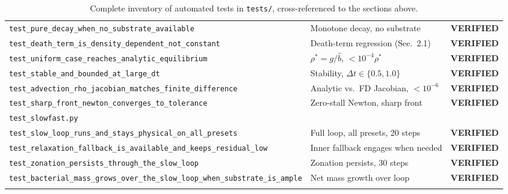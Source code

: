 \documentclass[11pt]{article}
\newcommand{\verified}{\textcolor{green!45!black}{\textbf{VERIFIED}}}
\newcommand{\code}[1]{\texttt{#1}}
\newcommand{\test}[1]{\texttt{\small #1}}
\begin{document}
\begin{longtable}{p{3.6cm}p{9.4cm}c}
\test{test\_pure\_decay\_when\_no\_substrate\_available} & Monotone decay, no substrate & \verified \\
\test{test\_death\_term\_is\_density\_dependent\_not\_constant} & Death-term regression (Sec.~2.1) & \verified \\
\test{test\_uniform\_case\_reaches\_analytic\_equilibrium} & $\rho^\ast=g/\hat b$, $<10^{-4}\rho^\ast$ & \verified \\
\test{test\_stable\_and\_bounded\_at\_large\_dt} & Stability, $\Delta t\in\{0.5,1.0\}$ & \verified \\
\test{test\_advection\_rho\_jacobian\_matches\_finite\_difference} & Analytic vs.\ FD Jacobian, $<10^{-6}$ & \verified \\
\test{test\_sharp\_front\_newton\_converges\_to\_tolerance} & Zero-stall Newton, sharp front & \verified \\
\midrule
\multicolumn{3}{l}{\code{test\_slowfast.py}} \\
\test{test\_slow\_loop\_runs\_and\_stays\_physical\_on\_all\_presets} & Full loop, all presets, 20 steps & \verified \\
\test{test\_relaxation\_fallback\_is\_available\_and\_keeps\_residual\_low} & Inner fallback engages when needed & \verified \\
\test{test\_zonation\_persists\_through\_the\_slow\_loop} & Zonation persists, 30 steps & \verified \\
\test{test\_bacterial\_mass\_grows\_over\_the\_slow\_loop\_when\_substrate\_is\_ample} & Net mass growth over loop & \verified \\
\bottomrule
\caption{Complete inventory of automated tests in \code{tests/}, cross-referenced to the sections above.}
\label{tab:testmap}
\end{longtable}
\end{document}
